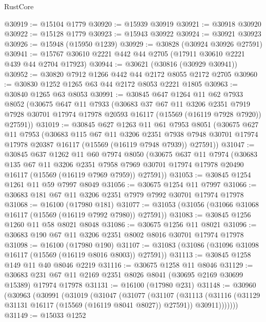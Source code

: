 \begin{lexlean}{RustCore}
\begin{coremodule}
@30919 := @15104 @1779
@30920 := @15939 @30919
@30921 := @30918 @30920
@30922 := @15128 @1779
@30923 := @15943 @30922
@30924 := @30921 @30923
@30926 := @15948 (@15950 @1239)
@30929 := @30828 (@30924 @30926 @27591)
@30941 := @15767 @30610 @2221 @442 @44 @2705 (@17911 @30610 @2221 @439 @44 @2704 @17923)
@30944 := @30621 (@30816 (@30929 @30941))
@30952 := @30820 @7912 @1266 @442 @44 @2172 @8055 @2172 @2705
@30960 := @30830 @1252 @1265 @63 @44 @2172 @8053 @2221 @1805
@30963 := @30840 @1265 @63 @8053
@30991 := @30845
    @647
    @1264
    @11
    @62
    @7933
    @8052
    (@30675
      @647
      @11
      @7933
      (@30683
        @37
        @67
        @11
        @3206
        @2351
        @7919
        @7928
        @30701
        @17974
        @17978
        @20593
        @16117
        (@15569 (@16119 @7928 @7920))
        @27591))
@31019 := @30845
    @627
    @1263
    @11
    @61
    @7953
    @8051
    (@30675
      @627
      @11
      @7953
      (@30683
        @115
        @67
        @11
        @3206
        @2351
        @7938
        @7948
        @30701
        @17974
        @17978
        @20387
        @16117
        (@15569 (@16119 @7948 @7939))
        @27591))
@31047 := @30845
    @637
    @1262
    @11
    @60
    @7974
    @8050
    (@30675
      @637
      @11
      @7974
      (@30683
        @135
        @67
        @11
        @3206
        @2351
        @7958
        @7969
        @30701
        @17974
        @17978
        @20490
        @16117
        (@15569 (@16119 @7969 @7959))
        @27591))
@31053 := @30845 @1254 @1261 @11 @59 @7997 @8049
@31056 := @30675 @1254 @11 @7997
@31066 := @30683 @181 @67 @11 @3206 @2351 @7979 @7992 @30701 @17974 @17978
@31068 := @16100 (@17980 @181)
@31077 := @31053 (@31056 (@31066 @31068 @16117 (@15569 (@16119 @7992 @7980)) @27591))
@31083 := @30845 @1256 @1260 @11 @58 @8021 @8048
@31086 := @30675 @1256 @11 @8021
@31096 := @30683 @190 @67 @11 @3206 @2351 @8002 @8016 @30701 @17974 @17978
@31098 := @16100 (@17980 @190)
@31107 := @31083 (@31086 (@31096 @31098 @16117 (@15569 (@16119 @8016 @8003)) @27591))
@31113 := @30845 @1258 @149 @11 @40 @8046 @2219
@31116 := @30675 @1258 @11 @8046
@31129 := @30683 @231 @67 @11 @2169 @2351 @8026 @8041 (@30695 @2169 @30699 @15389) @17974 @17978
@31131 := @16100 (@17980 @231)
@31148 := @30960
    (@30963
      (@30991
        (@31019
          (@31047
            (@31077
              (@31107
                (@31113
                  (@31116 (@31129 @31131 @16117 (@15569 (@16119 @8041 @8027)) @27591))
                  @30911)))))))
@31149 := @15033 @1252

\end{coremodule}
\end{lexlean}
